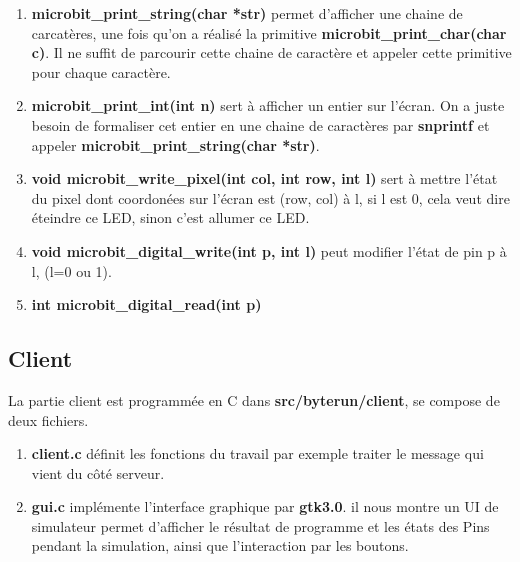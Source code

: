 \documentclass[14px]{article}
\begin{document}
\begin{enumerate}
	\item \textbf{microbit\_print\_string(char *str)} permet d'afficher une chaine de carcatères, une fois qu'on a réalisé la primitive \textbf{microbit\_print\_char(char c)}. Il ne suffit de parcourir cette chaine de caractère et appeler cette primitive pour chaque caractère.
	\item \textbf{microbit\_print\_int(int n)} sert à afficher un entier sur l'écran. On a juste besoin de formaliser cet entier en une chaine de caractères par \textbf{snprintf} et appeler \textbf{microbit\_print\_string(char *str)}.
	\item \textbf{void microbit\_write\_pixel(int col, int row, int l)} sert à mettre l'état du pixel dont coordonées sur l'écran est (row, col) à l, si l est 0, cela veut dire éteindre ce LED, sinon c'est allumer ce LED.
	\item \textbf{void microbit\_digital\_write(int p, int l)} peut modifier l'état de pin p à l, (l=0 ou 1).
	\item \textbf{int microbit_digital_read(int p)}

\end{enumerate}



\subsection{Client}
La partie client est programmée en C dans \textbf{src/byterun/client}, se compose de deux fichiers.
\begin{enumerate}
	\item \textbf{client.c} définit les fonctions du travail par exemple traiter le message qui vient du côté serveur.

	\item \textbf{gui.c} implémente l'interface graphique par \textbf{gtk3.0}.
	il nous montre un UI de simulateur permet d'afficher le résultat de programme et les états des Pins pendant la simulation, ainsi que l'interaction par les boutons.\\
\end{enumerate}
\end{document}

